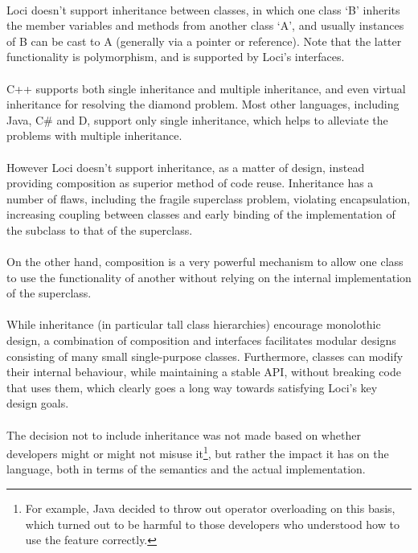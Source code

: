 \documentclass[12pt,twoside,notitlepage]{report}
\begin{document}
\paragraph{}
Loci doesn't support inheritance between classes, in which one class `B' inherits the member variables and methods from another class `A', and usually instances of B can be cast to A (generally via a pointer or reference). Note that the latter functionality is polymorphism, and is supported by Loci's interfaces.

\paragraph{}
C++ supports both single inheritance and multiple inheritance, and even virtual inheritance for resolving the diamond problem. Most other languages, including Java, C\# and D, support only single inheritance, which helps to alleviate the problems with multiple inheritance.

\paragraph{}
However Loci doesn't support inheritance, as a matter of design, instead providing composition as superior method of code reuse. Inheritance has a number of flaws, including the fragile superclass problem, violating encapsulation, increasing coupling between classes and early binding of the implementation of the subclass to that of the superclass.

\paragraph{}
On the other hand, composition is a very powerful mechanism to allow one class to use the functionality of another without relying on the internal implementation of the superclass.

\paragraph{}
While inheritance (in particular tall class hierarchies) encourage monolothic design, a combination of composition and interfaces facilitates modular designs consisting of many small single-purpose classes. Furthermore, classes can modify their internal behaviour, while maintaining a stable API, without breaking code that uses them, which clearly goes a long way towards satisfying Loci's key design goals.

\paragraph{}
The decision not to include inheritance was not made based on whether developers might or might not misuse it\footnote{For example, Java decided to throw out operator overloading on this basis, which turned out to be harmful to those developers who understood how to use the feature correctly.}, but rather the impact it has on the language, both in terms of the semantics and the actual implementation.
\end{document}
